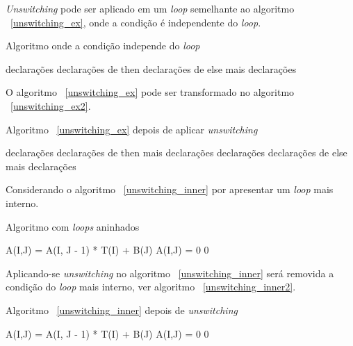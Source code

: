 \textit{Unswitching} pode ser aplicado em um \textit{loop} semelhante ao 
algoritmo ~\ref{unswitching_ex}, onde a condição é independente do \textit{loop}.


\begin{algorithm}
\caption{Algoritmo onde a condição independe do \textit{loop}}
\label{unswitching_ex}
\begin{algorithmic}[1]

\LOOP
\STATE declarações
\STATE declarações de then
\ELSE 
\STATE declarações de else
\ENDIF
\STATE mais declarações
\ENDLOOP

\end{algorithmic}
\end{algorithm}

O algoritmo ~\ref{unswitching_ex} pode ser transformado no algoritmo
~\ref{unswitching_ex2}.

\begin{algorithm}
\caption{Algoritmo ~\ref{unswitching_ex} depois de aplicar \textit{unswitching}}
\label{unswitching_ex2}
\begin{algorithmic}[1]

\LOOP
\STATE declarações
\STATE declarações de then
\STATE mais declarações
\ENDLOOP
\ELSE 
\LOOP
\STATE declarações
\STATE declarações de else
\STATE mais declarações
\ENDLOOP
\ENDIF

\end{algorithmic}
\end{algorithm}

Considerando o algoritmo ~\ref{unswitching_inner} por apresentar um 
\textit{loop} mais interno. 

\begin{algorithm}
\caption{Algoritmo com \textit{loops} aninhados}
\label{unswitching_inner}
\begin{algorithmic}[1]

\STATE A(I,J) = A(I, J - 1) * T(I) + B(J) 
\ELSE
\STATE A(I,J) = 0 0 
\ENDIF
\ENDFOR
\ENDFOR

\end{algorithmic}
\end{algorithm}

Aplicando-se \textit{unswitching} no algoritmo ~\ref{unswitching_inner} será 
removida a condição do \textit{loop} mais interno, ver algoritmo
~\ref{unswitching_inner2}.

\begin{algorithm}
\caption{Algoritmo ~\ref{unswitching_inner} depois de \textit{unswitching}}
\label{unswitching_inner2}
\begin{algorithmic}[1]

\STATE A(I,J) = A(I, J - 1) * T(I) + B(J) 
\ENDFOR
\ELSE
{}
\STATE A(I,J) = 0 0 
\ENDFOR
\ENDIF
\ENDFOR

\end{algorithmic}
\end{algorithm}

